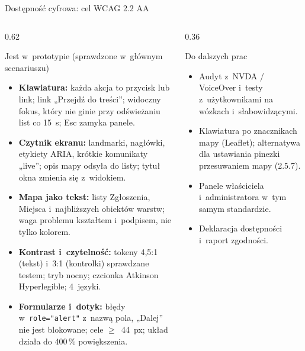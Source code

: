 \begin{frame}{Dostępność cyfrowa: cel WCAG 2.2 AA}
  \begin{columns}[T,onlytextwidth]
    \begin{column}{0.62\textwidth}
      \begin{block}{Jest w~prototypie (sprawdzone w~głównym scenariuszu)}
        \footnotesize
        \begin{itemize}
          \item \textbf{Klawiatura:} każda akcja to przycisk lub link; link „Przejdź do treści”; widoczny fokus,
                który nie ginie przy odświeżaniu list co 15~s; Esc zamyka panele.
          \item \textbf{Czytnik ekranu:} landmarki, nagłówki, etykiety ARIA, krótkie komunikaty „live”;
                opis mapy odsyła do listy; tytuł okna zmienia się z~widokiem.
          \item \textbf{Mapa jako tekst:} listy Zgłoszenia, Miejsca i~najbliższych obiektów warstw;
                waga problemu kształtem i~podpisem, nie tylko kolorem.
          \item \textbf{Kontrast i~czytelność:} tokeny 4,5:1 (tekst) i~3:1 (kontrolki) sprawdzane testem;
                tryb nocny; czcionka Atkinson Hyperlegible; 4~języki.
          \item \textbf{Formularze i~dotyk:} błędy w~\texttt{role="alert"} z~nazwą pola, „Dalej” nie jest blokowane;
                cele $\geq$~44~px; układ działa do 400\,\% powiększenia.
        \end{itemize}
      \end{block}
    \end{column}
    \begin{column}{0.36\textwidth}
      \begin{alertblock}{Do dalszych prac}
        \footnotesize
        \begin{itemize}
          \item Audyt z~NVDA / VoiceOver i~testy z~użytkownikami na wózkach i~słabowidzącymi.
          \item Klawiatura po znacznikach mapy (Leaflet); alternatywa dla ustawiania pinezki
                przesuwaniem mapy (2.5.7).
          \item Panele właściciela i~administratora w~tym samym standardzie.
          \item Deklaracja dostępności i~raport zgodności.
        \end{itemize}
      \end{alertblock}
      \vspace{0.5mm}
    \end{column}
  \end{columns}


\end{frame}
